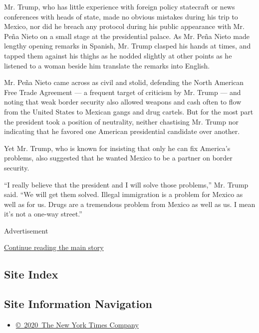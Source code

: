 Mr. Trump, who has little experience with foreign policy statecraft or
news conferences with heads of state, made no obvious mistakes during
his trip to Mexico, nor did he breach any protocol during his public
appearance with Mr. Peña Nieto on a small stage at the presidential
palace. As Mr. Peña Nieto made lengthy opening remarks in Spanish, Mr.
Trump clasped his hands at times, and tapped them against his thighs as
he nodded slightly at other points as he listened to a woman beside him
translate the remarks into English.

Mr. Peña Nieto came across as civil and stolid, defending the North
American Free Trade Agreement --- a frequent target of criticism by Mr.
Trump --- and noting that weak border security also allowed weapons and
cash often to flow from the United States to Mexican gangs and drug
cartels. But for the most part the president took a position of
neutrality, neither chastising Mr. Trump nor indicating that he favored
one American presidential candidate over another.

Yet Mr. Trump, who is known for insisting that only he can fix America's
problems, also suggested that he wanted Mexico to be a partner on border
security.

``I really believe that the president and I will solve those problems,''
Mr. Trump said. ``We will get them solved. Illegal immigration is a
problem for Mexico as well as for us. Drugs are a tremendous problem
from Mexico as well as us. I mean it's not a one-way street.''

Advertisement

\protect\hyperlink{after-bottom}{Continue reading the main story}

\hypertarget{site-index}{%
\subsection{Site Index}\label{site-index}}

\hypertarget{site-information-navigation}{%
\subsection{Site Information
Navigation}\label{site-information-navigation}}

\begin{itemize}
\tightlist
\item
  \href{https://help.nytimes.com/hc/en-us/articles/115014792127-Copyright-notice}{©~2020~The
  New York Times Company}
\end{itemize}

